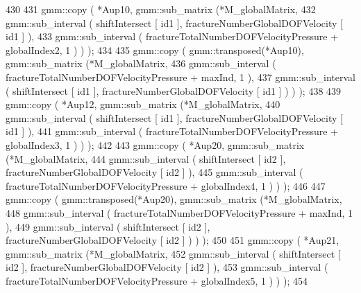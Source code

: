 \begin{DoxyCode}
430 \textcolor{comment}{}
431 \textcolor{comment}{        gmm::copy ( *Aup10, gmm::sub\_matrix (*M\_globalMatrix,}
432 \textcolor{comment}{                                            gmm::sub\_interval ( shiftIntersect [ id1 ],
       fractureNumberGlobalDOFVelocity [ id1 ] ),}
433 \textcolor{comment}{                                            gmm::sub\_interval (  fractureTotalNumberDOFVelocityPressure +
       globalIndex2, 1 ) ) );}
434 \textcolor{comment}{}
435 \textcolor{comment}{        gmm::copy ( gmm::transposed(*Aup10), gmm::sub\_matrix (*M\_globalMatrix,}
436 \textcolor{comment}{                            gmm::sub\_interval (  fractureTotalNumberDOFVelocityPressure + maxInd, 1 ),}
437 \textcolor{comment}{                            gmm::sub\_interval ( shiftIntersect [ id1 ], fractureNumberGlobalDOFVelocity [
       id1 ] ) ) );}
438 \textcolor{comment}{}
439 \textcolor{comment}{        gmm::copy ( *Aup12, gmm::sub\_matrix (*M\_globalMatrix,}
440 \textcolor{comment}{                                            gmm::sub\_interval ( shiftIntersect [ id1 ],
       fractureNumberGlobalDOFVelocity [ id1 ] ),}
441 \textcolor{comment}{                                            gmm::sub\_interval (  fractureTotalNumberDOFVelocityPressure +
       globalIndex3, 1 ) ) );}
442 \textcolor{comment}{}
443 \textcolor{comment}{        gmm::copy ( *Aup20, gmm::sub\_matrix (*M\_globalMatrix,}
444 \textcolor{comment}{                                            gmm::sub\_interval ( shiftIntersect [ id2 ],
       fractureNumberGlobalDOFVelocity [ id2 ] ),}
445 \textcolor{comment}{                                            gmm::sub\_interval (  fractureTotalNumberDOFVelocityPressure +
       globalIndex4, 1 ) ) );}
446 \textcolor{comment}{}
447 \textcolor{comment}{        gmm::copy ( gmm::transposed(*Aup20), gmm::sub\_matrix (*M\_globalMatrix,}
448 \textcolor{comment}{                            gmm::sub\_interval (  fractureTotalNumberDOFVelocityPressure + maxInd, 1 ),}
449 \textcolor{comment}{                            gmm::sub\_interval ( shiftIntersect [ id2 ], fractureNumberGlobalDOFVelocity [
       id2 ] ) ) );}
450 \textcolor{comment}{}
451 \textcolor{comment}{        gmm::copy ( *Aup21, gmm::sub\_matrix (*M\_globalMatrix,}
452 \textcolor{comment}{                                            gmm::sub\_interval ( shiftIntersect [ id2 ],
       fractureNumberGlobalDOFVelocity [ id2 ] ),}
453 \textcolor{comment}{                                            gmm::sub\_interval (  fractureTotalNumberDOFVelocityPressure +
       globalIndex5, 1 ) ) );}
454 \textcolor{comment}{}

\end{DoxyCode}

